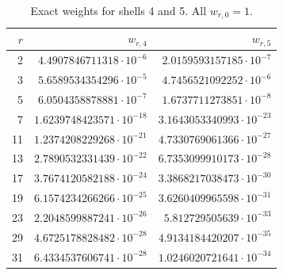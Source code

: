 \begin{table}[htbp]
\centering\scriptsize
\caption{Exact weights for shells 4 and 5. All $w_{r,0}=1$.}
\label{tab:weights45}
\begin{tabular}{rrr}
\toprule
$r$ & $w_{r,4}$ & $w_{r,5}$\\
\midrule
2 & $4.4907846711318\cdot10^{-6}$ & $2.0159593157185\cdot10^{-7}$\\
3 & $5.6589534354296\cdot10^{-5}$ & $4.7456521092252\cdot10^{-6}$\\
5 & $6.0504358878881\cdot10^{-7}$ & $1.6737711273851\cdot10^{-8}$\\
7 & $1.6239748423571\cdot10^{-18}$ & $3.1643053340993\cdot10^{-23}$\\
11 & $1.2374208229268\cdot10^{-21}$ & $4.7330769061366\cdot10^{-27}$\\
13 & $2.7890532331439\cdot10^{-22}$ & $6.7353099910173\cdot10^{-28}$\\
17 & $3.7674120582188\cdot10^{-24}$ & $3.3868217038473\cdot10^{-30}$\\
19 & $6.1574234266266\cdot10^{-25}$ & $3.6260409965598\cdot10^{-31}$\\
23 & $2.2048599887241\cdot10^{-26}$ & $5.812729505639\cdot10^{-33}$\\
29 & $4.6725178828482\cdot10^{-28}$ & $4.9134184420207\cdot10^{-35}$\\
31 & $6.4334537606741\cdot10^{-28}$ & $1.0246020721641\cdot10^{-34}$\\
\bottomrule
\end{tabular}
\end{table}
